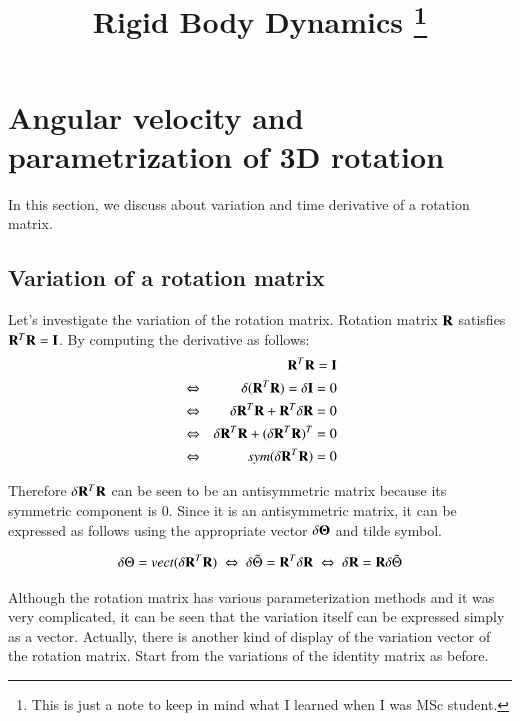 

\title{Rigid Body Dynamics \footnote{This is just a note to keep in mind what I learned when I was MSc student.}}




\maketitle
\tableofcontents


\section{Angular velocity and parametrization of 3D rotation}

In this section, we discuss about variation and time derivative of a rotation matrix.

\subsection{Variation of a rotation matrix}

Let's investigate the variation of the rotation matrix. Rotation matrix $\mathbf{R}$ satisfies $\mathbf{R}^T \mathbf{R} = \mathbf{I}$. By computing the derivative as follows:
%
\begin{eqnarray}
&&  \mathbf{R}^T \mathbf{R} = \mathbf{I}\\
&\Leftrightarrow& \delta(\mathbf{R}^T\mathbf{R}) = \delta\mathbf{I} = 0\\
&\Leftrightarrow& \delta\mathbf{R}^T\mathbf{R} + \mathbf{R}^T\delta\mathbf{R} = 0\\
&\Leftrightarrow& \delta\mathbf{R}^T\mathbf{R} + (\delta\mathbf{R}^T\mathbf{R})^T = 0\\
&\Leftrightarrow& sym(\delta\mathbf{R}^T\mathbf{R}) = 0
\end{eqnarray}

Therefore $\delta\mathbf{R}^T\mathbf{R}$ can be seen to be an antisymmetric matrix because its symmetric component is 0. Since it is an antisymmetric matrix, it can be expressed as follows using the appropriate vector $\delta\mathbf{\Theta}$ and tilde symbol.


\begin{equation}
\delta\Theta = vect(\delta\mathbf{R}^T\mathbf{R}) \;\Leftrightarrow\; \delta\tilde{{\Theta}} = \mathbf{R}^T\delta\mathbf{R} \;\Leftrightarrow\; \delta\mathbf{R} = \mathbf{R}\delta\tilde{{\Theta}}
\end{equation}

Although the rotation matrix has various parameterization methods and it was very complicated, it can be seen that the variation itself can be expressed simply as a vector. Actually, there is another kind of display of the variation vector of the rotation matrix. Start from the variations of the identity matrix as before.

